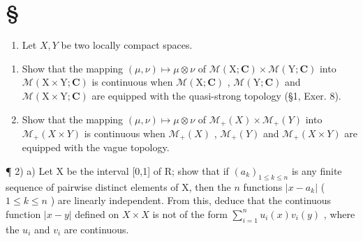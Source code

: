 \section*{\texorpdfstring{\S\CurrentExerciseGroup}{Section \CurrentExerciseGroup}}
{}

\begin{enumerate}
\def\labelenumi{\arabic{enumi})}
\tightlist
\item
  Let \(X, Y\) be two locally compact spaces.
\end{enumerate}

\begin{enumerate}
\def\labelenumi{\alph{enumi})}
\item
  Show that the mapping \((\mu, \nu) \mapsto \mu \otimes \nu\) of \(\mathcal{M}(\mathrm{X};\mathbf{C}) \times \mathcal{M}(\mathrm{Y};\mathbf{C})\) into \(\mathcal{M}(\mathrm{X} \times \mathrm{Y};\mathbf{C})\) is continuous when \(\mathcal{M}(\mathrm{X};\mathbf{C})\) , \(\mathcal{M}(\mathrm{Y};\mathbf{C})\) and \(\mathcal{M}(\mathrm{X} \times \mathrm{Y};\mathbf{C})\) are equipped with the quasi-strong topology (§1, Exer. 8).
\item
  Show that the mapping \((\mu, \nu) \mapsto \mu \otimes \nu\) of \(\mathcal{M}_{+}(X) \times \mathcal{M}_{+}(Y)\) into \(\mathcal{M}_{+}(X \times Y)\) is continuous when \(\mathcal{M}_{+}(X)\) , \(\mathcal{M}_{+}(Y)\) and \(\mathcal{M}_{+}(X \times Y)\) are equipped with the vague topology.
\end{enumerate}

¶ 2) a) Let X be the interval {[}0,1{]} of R; show that if \((a_k)_{1 \leqslant k \leqslant n}\) is any finite sequence of pairwise distinct elements of X, then the \(n\) functions \(|x - a_k|\) ( \(1 \leqslant k \leqslant n\) ) are linearly independent. From this, deduce that the continuous function \(|x - y|\) defined on \(X \times X\) is not of the form \(\sum_{i=1}^{n} u_i(x)v_i(y)\) , where the \(u_i\) and \(v_i\) are continuous.

